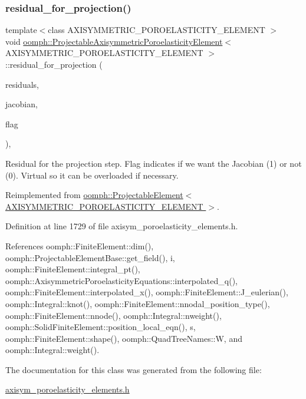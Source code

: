 \subsubsection{\texorpdfstring{residual\+\_\+for\+\_\+projection()}{residual\_for\_projection()}}
{\footnotesize\ttfamily template$<$class A\+X\+I\+S\+Y\+M\+M\+E\+T\+R\+I\+C\+\_\+\+P\+O\+R\+O\+E\+L\+A\+S\+T\+I\+C\+I\+T\+Y\+\_\+\+E\+L\+E\+M\+E\+NT $>$ \\
void \hyperlink{classoomph_1_1ProjectableAxisymmetricPoroelasticityElement}{oomph\+::\+Projectable\+Axisymmetric\+Poroelasticity\+Element}$<$ A\+X\+I\+S\+Y\+M\+M\+E\+T\+R\+I\+C\+\_\+\+P\+O\+R\+O\+E\+L\+A\+S\+T\+I\+C\+I\+T\+Y\+\_\+\+E\+L\+E\+M\+E\+NT $>$\+::residual\+\_\+for\+\_\+projection (\begin{DoxyParamCaption}\item[{\hyperlink{classoomph_1_1Vector}{Vector}$<$ double $>$ \&}]{residuals,  }\item[{\hyperlink{classoomph_1_1DenseMatrix}{Dense\+Matrix}$<$ double $>$ \&}]{jacobian,  }\item[{const unsigned \&}]{flag }\end{DoxyParamCaption})\hspace{0.3cm}{\ttfamily [inline]}, {\ttfamily [virtual]}}



Residual for the projection step. Flag indicates if we want the Jacobian (1) or not (0). Virtual so it can be overloaded if necessary. 



Reimplemented from \hyperlink{classoomph_1_1ProjectableElement_a1ff7a9207ec5e4fc2508e75064e136de}{oomph\+::\+Projectable\+Element$<$ A\+X\+I\+S\+Y\+M\+M\+E\+T\+R\+I\+C\+\_\+\+P\+O\+R\+O\+E\+L\+A\+S\+T\+I\+C\+I\+T\+Y\+\_\+\+E\+L\+E\+M\+E\+N\+T $>$}.



Definition at line 1729 of file axisym\+\_\+poroelasticity\+\_\+elements.\+h.



References oomph\+::\+Finite\+Element\+::dim(), oomph\+::\+Projectable\+Element\+Base\+::get\+\_\+field(), i, oomph\+::\+Finite\+Element\+::integral\+\_\+pt(), oomph\+::\+Axisymmetric\+Poroelasticity\+Equations\+::interpolated\+\_\+q(), oomph\+::\+Finite\+Element\+::interpolated\+\_\+x(), oomph\+::\+Finite\+Element\+::\+J\+\_\+eulerian(), oomph\+::\+Integral\+::knot(), oomph\+::\+Finite\+Element\+::nnodal\+\_\+position\+\_\+type(), oomph\+::\+Finite\+Element\+::nnode(), oomph\+::\+Integral\+::nweight(), oomph\+::\+Solid\+Finite\+Element\+::position\+\_\+local\+\_\+eqn(), s, oomph\+::\+Finite\+Element\+::shape(), oomph\+::\+Quad\+Tree\+Names\+::W, and oomph\+::\+Integral\+::weight().



The documentation for this class was generated from the following file\+:\begin{DoxyCompactItemize}
\item 
\hyperlink{axisym__poroelasticity__elements_8h}{axisym\+\_\+poroelasticity\+\_\+elements.\+h}\end{DoxyCompactItemize}
